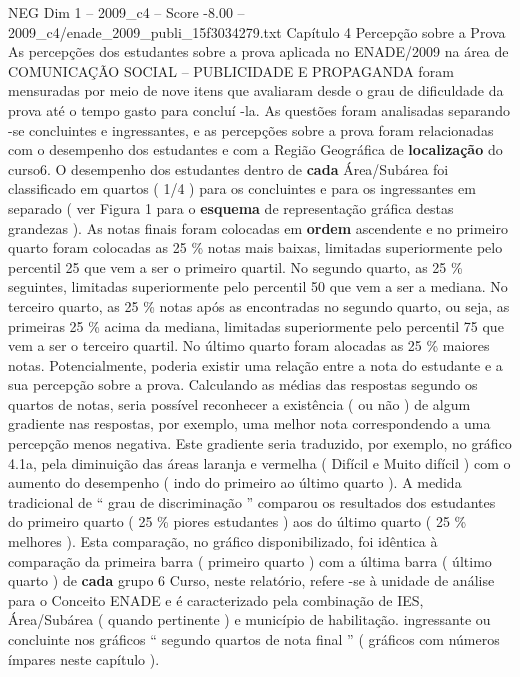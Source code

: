 \begin{textsample}{NEG Dim 1 – 2009\_c4 – Score -8.00 – 2009\_c4/enade\_2009\_publi\_15f3034279.txt}  \label{ex:f1_neg_028}
Capítulo 4 Percepção sobre a Prova As percepções dos estudantes sobre a prova aplicada no ENADE/2009 na área de COMUNICAÇÃO SOCIAL – PUBLICIDADE E PROPAGANDA foram mensuradas por meio de nove itens que avaliaram desde o grau de dificuldade da prova até o tempo gasto para concluí -la.
As questões foram analisadas separando -se concluintes e ingressantes, e as percepções sobre a prova foram relacionadas com o desempenho dos estudantes e com a Região Geográfica de \textbf{localização} do curso6.
O desempenho dos estudantes dentro de \textbf{cada} Área/Subárea foi classificado em quartos ( 1/4 ) para os concluintes e para os ingressantes em separado ( ver Figura 1 para o \textbf{esquema} de representação gráfica destas grandezas ).
As notas finais foram colocadas em \textbf{ordem} ascendente e no primeiro quarto foram colocadas as 25 \% notas mais baixas, limitadas superiormente pelo percentil 25 que vem a ser o primeiro quartil.
No segundo quarto, as 25 \% seguintes, limitadas superiormente pelo percentil 50 que vem a ser a mediana.
No terceiro quarto, as 25 \% notas após as encontradas no segundo quarto, ou seja, as primeiras 25 \% acima da mediana, limitadas superiormente pelo percentil 75 que vem a ser o terceiro quartil.
No último quarto foram alocadas as 25 \% maiores notas.
Potencialmente, poderia existir uma relação entre a nota do estudante e a sua percepção sobre a prova.
Calculando as médias das respostas segundo os quartos de notas, seria possível reconhecer a existência ( ou não ) de algum gradiente nas respostas, por exemplo, uma melhor nota correspondendo a uma percepção menos negativa.
Este gradiente seria traduzido, por exemplo, no gráfico 4.1a, pela diminuição das áreas laranja e vermelha ( Difícil e Muito difícil ) com o aumento do desempenho ( indo do primeiro ao último quarto ).
A medida tradicional de “ grau de discriminação ” comparou os resultados dos estudantes do primeiro quarto ( 25 \% piores estudantes ) aos do último quarto ( 25 \% melhores ).
Esta comparação, no gráfico disponibilizado, foi idêntica à comparação da primeira barra ( primeiro quarto ) com a última barra ( último quarto ) de \textbf{cada} grupo 6 Curso, neste relatório, refere -se à unidade de análise para o Conceito ENADE e é caracterizado pela combinação de IES, Área/Subárea ( quando pertinente ) e município de habilitação. ingressante ou concluinte nos gráficos “ segundo quartos de nota final ” ( gráficos com números ímpares neste capítulo ).

\end{textsample}
